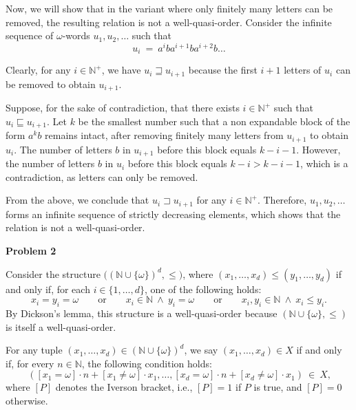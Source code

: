 \documentclass[12pt]{article}
\begin{document}
	\medskip
	
	Now, we will show that in the variant where only finitely many letters can
	be removed, the resulting relation is not a well-quasi-order. Consider the
	infinite sequence of \(\omega\)-words \(u_{1}, u_{2}, \ldots\) such that
	\[ u_{i} \ = \ a^{i} b a^{i + 1} b a^{i + 2} b \ldots \]
	
	Clearly, for any \(i \in \mathbb{N}^{+}\), we have \(u_{i} \sqsupseteq
	u_{i + 1}\) because the first \(i + 1\) letters of \(u_{i}\) can be removed
	to obtain \(u_{i + 1}\).
	
	\medskip
	
	Suppose, for the sake of contradiction, that there exists \(i \in
	\mathbb{N}^{+}\) such that \(u_{i} \sqsubseteq u_{i + 1}\). Let \(k\) be the
	smallest number such that a non expandable block of the form \(a^{k} b\)
	remains intact, after removing finitely many letters from \(u_{i + 1}\) to
	obtain \(u_{i}\). The number of letters \(b\) in \(u_{i + 1}\) before this
	block equals \(k - i - 1\). However, the number of letters \(b\) in
	\(u_{i}\) before this block equals \(k - i > k - i - 1\), which is a
	contradiction, as letters can only be removed.
	
	\medskip
	
	From the above, we conclude that \(u_{i} \sqsupset u_{i + 1}\) for any \(i
	\in \mathbb{N}^{+}\). Therefore, \(u_{1}, u_{2}, \ldots\) forms an infinite
	sequence of strictly decreasing elements, which shows that the relation is
	not a well-quasi-order.
	
	\bigskip
	
	\textbf{Problem 2}
	
	\medskip
	
	Consider the structure \(\big( (\mathbb{N} \cup \{\omega\})^{d}, \leqslant
	\! \big)\), where \((x_{1}, \ldots, x_{d}) \leqslant (y_{1}, \ldots,
	y_{d})\) if and only if, for each \(i \in \{1, \ldots, d\}\), one of the
	following holds:
	\[ x_{i} = y_{i} = \omega \qquad \text{or} \qquad x_{i} \in \mathbb{N} \
	\wedge \ y_{i} = \omega \qquad \text{or} \qquad x_{i}, y_{i} \in \mathbb{N}
	\ \wedge \ x_{i} \leqslant y_{i} \text{.} \]
	By Dickson's lemma, this structure is a well-quasi-order because
	\((\mathbb{N} \cup \{\omega\}, \leqslant)\) is itself a well-quasi-order.
	
	\medskip
	
	For any tuple \((x_{1}, \ldots, x_{d}) \in (\mathbb{N} \cup
	\{\omega\})^{d}\), we say \((x_{1}, \ldots, x_{d}) \in X\) if and only if,
	for every \(n \in \mathbb{N}\), the following condition holds:
	\[ ([x_{1} = \omega] \cdot n + [x_{1} \neq \omega] \cdot x_{1}, \ldots,
	[x_{d} = \omega] \cdot n + [x_{d} \neq \omega] \cdot x_{1}) \ \in \ X
	\text{,} \]
	where \([P]\) denotes the Iverson bracket, i.e., \([P] = 1\) if \(P\) is
	true, and \([P] = 0\) otherwise.
	
\end{document}
